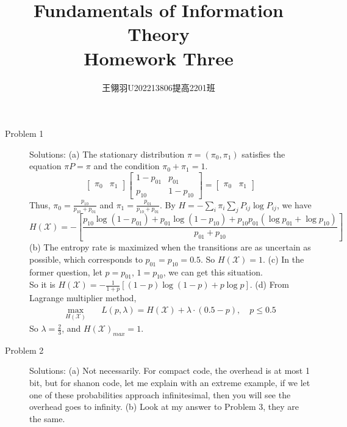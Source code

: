 \documentclass[11pt]{article}
\begin{document}
\title{\vspace{-2cm}Fundamentals of Information Theory\\ Homework Three}
\author{王翎羽\quad U202213806\quad 提高2201班}
\maketitle

\begin{description}
    \item[Problem 1] Solutions:
        \subitem(a) The stationary distribution \(\pi = (\pi_0, \pi_1)\) satisfies the equation \(\pi P = \pi\) and the condition \(\pi_0 + \pi_1 = 1\).
            \[
            \begin{bmatrix}
            \pi_0 & \pi_1
            \end{bmatrix}
            \begin{bmatrix}
            1 - p_{01} & p_{01} \\
            p_{10} & 1 - p_{10}
            \end{bmatrix}
            =
            \begin{bmatrix}
            \pi_0 & \pi_1
            \end{bmatrix}
            \]
            Thus, \(\pi_0 = \frac{p_{10}}{p_{10} + p_{01}}\) and \(\pi_1 = \frac{p_{01}}{p_{10} + p_{01}}\).
            By $H = - \sum_{i} \pi_i \sum_{j} P_{ij} \log P_{ij}$, we have \[H(\mathcal{X}) = - \left[ \frac{p_{10} \log (1 - p_{01}) + p_{01} \log (1 - p_{10}) + p_{10} p_{01} (\log p_{01} + \log p_{10})}{p_{01} + p_{10}} \right]\]
        \subitem(b) The entropy rate is maximized when the transitions are as uncertain as possible, which corresponds to \( p_{01} = p_{10} = 0.5 \). So $H(\mathcal{X})=1$.
        \subitem(c) In the former question, let $p=p_{01}$, $1=p_{10}$, we can get this situation. \\So it is $H(\mathcal{X}) = - \frac{1}{1 + p} \left[ (1 - p) \log (1 - p) + p \log p \right]$.
        \subitem(d) From Lagrange multiplier method, \begin{align*}
         \displaystyle\max_{H(\mathcal{X})} \quad & L(p,\lambda) = H(\mathcal{X}) + \lambda \cdot (0.5 - p),
         \quad  p \leq 0.5
        \end{align*}
    So $\lambda = \frac{2}{3}$, and $H(\mathcal{X})_{max} = 1$.
    \item[Problem 2] Solutions:
    \subitem(a) Not necessarily. For compact code, the overhead is at most 1 bit, but for shanon code, let me explain with an extreme example, if we let one of these probabilities approach infinitesimal, then you will see the overhead goes to infinity.
    \subitem(b) Look at my answer to Problem 3, they are the same.


\end{description}
\end{document}
